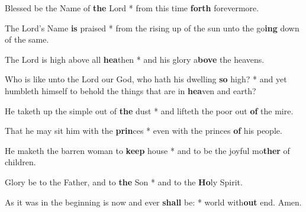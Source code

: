 \begin{multicols}{2}
	Blessed be the Name of \textbf{the} Lord * from this time \textbf{forth} forevermore.
	
	The Lord's Name \textbf{is} praised * from the rising up of the sun unto the go\textbf{ing} down of the same.
	
	The Lord is high above all \textbf{hea}then * and his glory a\textbf{bove} the heavens.
	
	Who is like unto the Lord our God, who hath his dwelling \textbf{so} high? * and yet humbleth himself to behold the things that are in \textbf{hea}ven and earth?
	
	He taketh up the simple out of \textbf{the} dust * and lifteth the poor out \textbf{of} the mire.
	
	That he may sit him with the \textbf{prin}ces * even with the princes \textbf{of} his people.
	
	He maketh the barren woman to \textbf{keep} house * and to be the joyful mo\textbf{ther} of children.
	
	Glory be to the Father, and to \textbf{the} Son * and to the \textbf{Ho}ly Spirit.
	
	As it was in the beginning is now and ever \textbf{shall} be: * world with\textbf{out} end. Amen.
\end{multicols}
